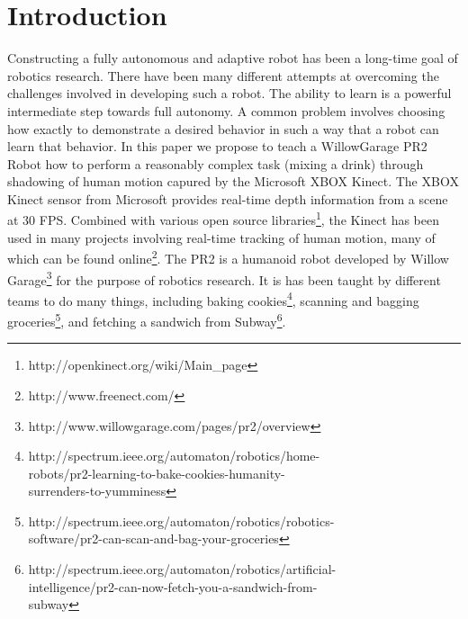 \documentclass{sig-alternate}
\begin{document}
\section{Introduction}
\label{sec:intro}
Constructing a fully autonomous and adaptive robot has been a long-time goal of robotics research. There have been many different attempts at overcoming the challenges involved in developing such a robot. The ability to learn is a powerful intermediate step towards full autonomy. A common problem involves choosing how exactly to demonstrate a desired behavior in such a way that a robot can learn that behavior. In this paper we propose to teach a WillowGarage PR2 Robot how to perform a reasonably complex task (mixing a drink) through shadowing of human motion capured by the Microsoft XBOX Kinect. The XBOX Kinect sensor from Microsoft provides real-time depth information from a scene at 30 FPS. Combined with various open source libraries\footnote{http://openkinect.org/wiki/Main\_page}, the Kinect has been used in many projects involving real-time tracking of human motion, many of which can be found online\footnote{http://www.freenect.com/}. The PR2 is a humanoid robot developed by  Willow Garage\footnote{http://www.willowgarage.com/pages/pr2/overview} for the purpose of robotics research. It is has been taught by different teams to do many things, including baking cookies\footnote{http://spectrum.ieee.org/automaton/robotics/home-\\robots/pr2-learning-to-bake-cookies-humanity-\\surrenders-to-yumminess}, scanning and bagging groceries\footnote{http://spectrum.ieee.org/automaton/robotics/robotics-\\software/pr2-can-scan-and-bag-your-groceries}, and fetching a sandwich from Subway\footnote{http://spectrum.ieee.org/automaton/robotics/artificial-\\intelligence/pr2-can-now-fetch-you-a-sandwich-from-\\subway}.
\end{document}
